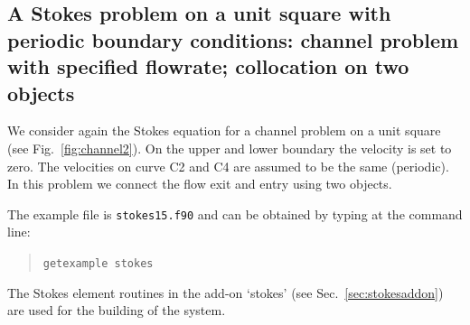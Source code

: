 \subsection{A Stokes problem on a unit square with periodic boundary
         conditions: channel problem with specified flowrate; collocation on
         two objects}
                                                                                
We consider again the Stokes equation for a channel problem on a unit square
(see Fig.~\ref{fig:channel2}). On the upper and lower boundary the velocity is
set to zero. The velocities on curve C2 and C4 are assumed to be the same
(periodic). In this problem we connect the flow exit and entry using two 
objects.
                                                                                
The example file is \texttt{stokes15.f90} and can be obtained by typing at the
command line:
\begin{quote}
   \texttt{getexample stokes}
\end{quote}
                                                                                
The Stokes element routines
in the add-on `stokes' (see Sec.~\ref{sec:stokesaddon}) are used for
the building of the system. 


